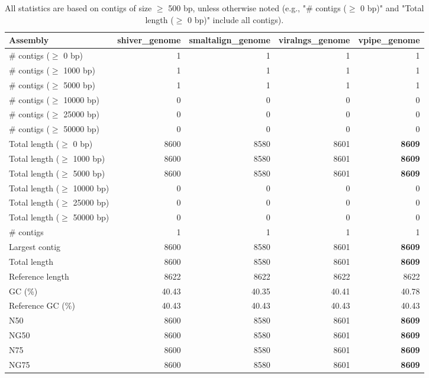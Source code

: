 \documentclass[12pt,a4paper]{article}
\begin{document}
\begin{table}[ht]
\begin{center}
\caption{All statistics are based on contigs of size $\geq$ 500 bp, unless otherwise noted (e.g., "\# contigs ($\geq$ 0 bp)" and "Total length ($\geq$ 0 bp)" include all contigs).}
\begin{tabular}{|l*{4}{|r}|}
\hline
Assembly & shiver\_genome & smaltalign\_genome & viralngs\_genome & vpipe\_genome \\ \hline
\# contigs ($\geq$ 0 bp) & 1 & 1 & 1 & 1 \\ \hline
\# contigs ($\geq$ 1000 bp) & 1 & 1 & 1 & 1 \\ \hline
\# contigs ($\geq$ 5000 bp) & 1 & 1 & 1 & 1 \\ \hline
\# contigs ($\geq$ 10000 bp) & 0 & 0 & 0 & 0 \\ \hline
\# contigs ($\geq$ 25000 bp) & 0 & 0 & 0 & 0 \\ \hline
\# contigs ($\geq$ 50000 bp) & 0 & 0 & 0 & 0 \\ \hline
Total length ($\geq$ 0 bp) & 8600 & 8580 & 8601 & {\bf 8609} \\ \hline
Total length ($\geq$ 1000 bp) & 8600 & 8580 & 8601 & {\bf 8609} \\ \hline
Total length ($\geq$ 5000 bp) & 8600 & 8580 & 8601 & {\bf 8609} \\ \hline
Total length ($\geq$ 10000 bp) & 0 & 0 & 0 & 0 \\ \hline
Total length ($\geq$ 25000 bp) & 0 & 0 & 0 & 0 \\ \hline
Total length ($\geq$ 50000 bp) & 0 & 0 & 0 & 0 \\ \hline
\# contigs & 1 & 1 & 1 & 1 \\ \hline
Largest contig & 8600 & 8580 & 8601 & {\bf 8609} \\ \hline
Total length & 8600 & 8580 & 8601 & {\bf 8609} \\ \hline
Reference length & 8622 & 8622 & 8622 & 8622 \\ \hline
GC (\%) & 40.43 & 40.35 & 40.41 & 40.78 \\ \hline
Reference GC (\%) & 40.43 & 40.43 & 40.43 & 40.43 \\ \hline
N50 & 8600 & 8580 & 8601 & {\bf 8609} \\ \hline
NG50 & 8600 & 8580 & 8601 & {\bf 8609} \\ \hline
N75 & 8600 & 8580 & 8601 & {\bf 8609} \\ \hline
NG75 & 8600 & 8580 & 8601 & {\bf 8609} \\ \hline

\end{tabular}
\end{center}
\end{table}
\end{document}
